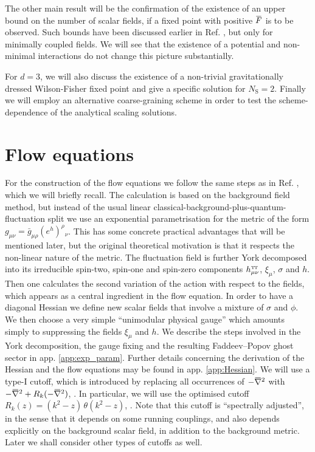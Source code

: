 \documentclass[11pt]{book}
\newcommand{\overbar}[1]{\mkern 1.5mu\overline{\mkern-1.5mu#1\mkern-1.5mu}\mkern 1.5mu}
\newcommand\TTspace{ -1pt }
\newcommand\hTTmunu{ h^{\scriptscriptstyle{\mathrm{T\hspace{\TTspace}T}}}_{\mu\nu} }
\newcommand\NS{ N_{\scriptscriptstyle{\mathrm{S}}} }
\newcommand{\bnabla}{\overbar \nabla}
\newcommand{\bF}{\overbar F}
\numberwithin{equation}{chapter}
\begin{document}
The other main result will be the confirmation
of the existence  of an upper bound on the number of scalar fields,
if a fixed point with positive $\bF$ is to be observed.
Such bounds have been discussed earlier in Ref. \cite{Dona:2013qba},
but only for minimally coupled fields.
We will see that the existence of a potential and non-minimal interactions do
not change this picture substantially.

For $d=3$, we will also discuss the existence
of a non-trivial gravitationally dressed Wilson-Fisher fixed point
and give a specific solution for $\NS=2$.
Finally we will employ an alternative coarse-graining scheme
in order to test the scheme-dependence of the analytical scaling solutions.


\section{Flow equations}

For the construction of the flow equations we follow the same steps
as in Ref. \cite{Percacci:2015wwa}, which we will briefly recall.
The calculation is based on the background field method,
but instead of the usual linear classical-background-plus-quantum-fluctuation split we
use an exponential parametrisation for the metric of the form
$g_{\mu\nu} = \bar g_{\mu\rho}(e^h)^\rho{}_\nu$.
This has some concrete practical advantages that will be mentioned later,
but the original theoretical motivation is that it
respects the non-linear nature of the metric.
The fluctuation field is further York decomposed into its irreducible
spin-two, spin-one and spin-zero components $\hTTmunu$,
$\xi_\mu$, $\sigma$ and $h$.
Then one calculates the second variation of the action with
respect to the fields, which appears as a central ingredient
in the flow equation.
In order to have a diagonal Hessian we define new scalar fields
that involve a mixture of $\sigma$ and $\phi$.
We then choose a very simple ``unimodular physical gauge''
which amounts simply to suppressing the fields $\xi_\mu$ and $h$.
We describe the steps involved in the York decomposition, the
gauge fixing and the resulting Faddeev–Popov ghost sector in app. \ref{app:exp_param}.
Further details concerning the derivation of the Hessian and the flow
equations may be found in app. \ref{app:Hessian}.
We will use a type-I cutoff, which is introduced by replacing
all occurrences of $-\bnabla^2$ with $-\bnabla^2+R_k(-\bnabla^2)$,
\cite{Codello:2008vh}.
In particular, we will use the optimised cutoff
$R_k(z)=\left( k^2-z \right) \, \theta \! \left( k^2-z \right)$, \cite{Litim:2001up}.
Note that this cutoff is ``spectrally adjusted'',
in the sense that it depends on some running couplings,
and also depends explicitly on the background scalar field,
in addition to the background metric.
Later we shall consider other types of cutoffs as well.
\end{document}
